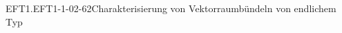 \begin{KORO}{EFT1.EFT1-1-02-62}{Charakterisierung von Vektorraumbündeln von endlichem Typ}

\end{KORO}
